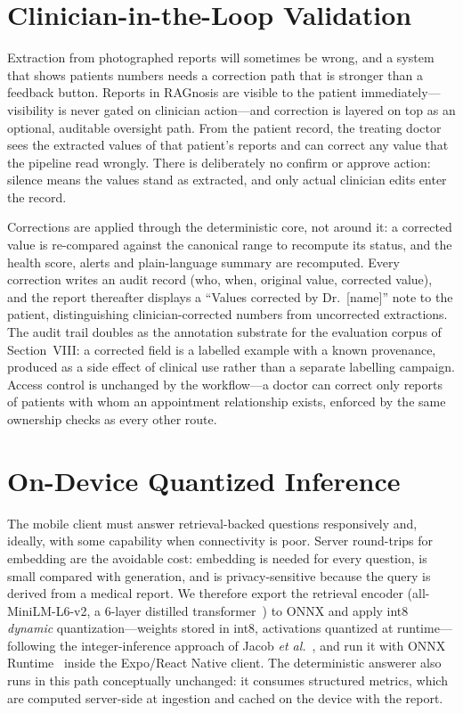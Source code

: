 \documentclass[conference]{IEEEtran}
\begin{document}
\section{Clinician-in-the-Loop Validation}
Extraction from photographed reports will sometimes be wrong, and a
system that shows patients numbers needs a correction path that is
stronger than a feedback button. Reports in RAGnosis are visible to
the patient immediately---visibility is never gated on clinician
action---and correction is layered on top as an optional, auditable
oversight path. From the patient record, the treating doctor sees the
extracted values of that patient's reports and can correct any value
that the pipeline read wrongly. There is deliberately no confirm or
approve action: silence means the values stand as extracted, and only
actual clinician edits enter the record.

Corrections are applied through the deterministic core, not around it:
a corrected value is re-compared against the canonical range to
recompute its status, and the health score, alerts and plain-language
summary are recomputed. Every correction writes an
audit record (who, when, original value, corrected value), and the
report thereafter displays a ``Values corrected by Dr.\ [name]'' note
to the patient, distinguishing clinician-corrected numbers from
uncorrected extractions. The audit trail doubles as the annotation substrate for
the evaluation corpus of Section~VIII: a corrected field is a labelled
example with a known provenance, produced as a side effect of clinical
use rather than a separate labelling campaign. Access control is
unchanged by the workflow---a doctor can correct only reports of
patients with whom an appointment relationship exists, enforced by the same
ownership checks as every other route.

\section{On-Device Quantized Inference}
The mobile client must answer retrieval-backed questions responsively
and, ideally, with some capability when connectivity is poor. Server
round-trips for embedding are the avoidable cost: embedding is needed
for every question, is small compared with generation, and is
privacy-sensitive because the query is derived from a medical report.
We therefore export the retrieval encoder (all-MiniLM-L6-v2, a 6-layer
distilled transformer~\cite{wang2020minilm}) to ONNX and apply int8
\emph{dynamic} quantization---weights stored in int8, activations
quantized at runtime---following the integer-inference approach of
Jacob \emph{et al.}~\cite{jacob2018quantization}, and run it with ONNX
Runtime~\cite{onnxruntime} inside the Expo/React Native client. The
deterministic answerer also runs in this path conceptually unchanged:
it consumes structured metrics, which are computed server-side at
ingestion and cached on the device with the report.
\end{document}
